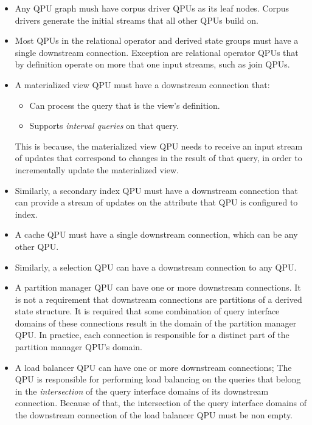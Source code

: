 \begin{itemize}
  \item Any QPU graph mush have corpus driver QPUs as its leaf nodes.
  Corpus drivers generate the initial streams that all other QPUs build on.

  \item Most QPUs in the relational operator and derived state groups must have a single downstream connection.
  Exception are relational operator QPUs that by definition operate on more that one input streams, such as join QPUs.

  \item A materialized view QPU must have a downstream connection that:
  \begin{itemize}
    \item Can process the query that is the view's definition.
    \item Supports \textit{interval queries} on that query.
  \end{itemize}
  This is because, the materialized view QPU needs to receive an input stream of updates that correspond to changes in
  the result of that query, in order to incrementally update the materialized view.

  \item Similarly, a secondary index QPU must have a downstream connection that can provide a stream of updates on the
  attribute that QPU is configured to index.

  \item A cache QPU must have a single downstream connection, which can be any other QPU.

  \item Similarly, a selection QPU can have a downstream connection to any QPU.

  \item A partition manager QPU can have one or more downstream connections.
  It is not a requirement that downstream connections are partitions of a derived state structure.
  It is required that some combination of query interface domains of these connections result in the domain of the
  partition manager QPU.
  In practice, each connection is responsible for a distinct part of the partition manager QPU's domain.

  \item A load balancer QPU can have one or more downstream connections;
  The QPU is responsible for performing load balancing on the queries that belong in the \textit{intersection} of the
  query interface domains of its downstream connection.
  Because of that, the intersection of the query interface domains of the downstream connection of the load balancer
  QPU must be non empty.
\end{itemize}

